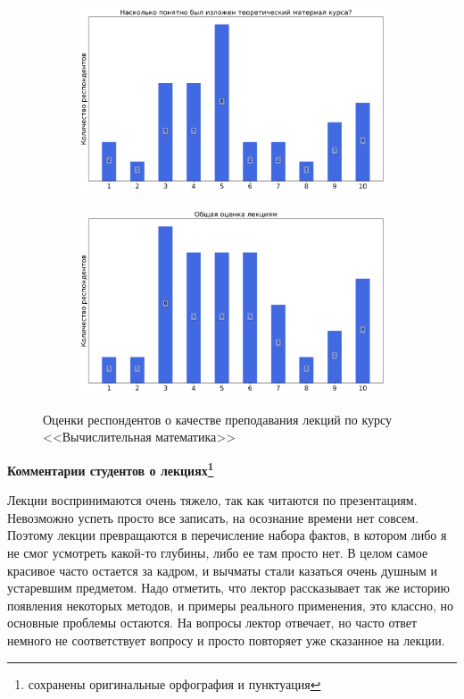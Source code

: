 \begin{figure}[H]
\begin{subfigure}[b]{0.45\textwidth}
			\end{subfigure}
			\begin{subfigure}[b]{0.45\textwidth}
				\centering
				\includegraphics[width=\textwidth]{images/3 course/Вычислительная математика/lecturer-marks-Петров И.Б.-2.png}
			\end{subfigure}	
			\begin{subfigure}[b]{0.45\textwidth}
				\centering
				\includegraphics[width=\textwidth]{images/3 course/Вычислительная математика/lecturer-marks-Петров И.Б.-3.png}
			\end{subfigure}
			\caption{Оценки респондентов о качестве преподавания лекций по курсу <<Вычислительная математика>>}
		\end{figure}

		\textbf{Комментарии студентов о лекциях\protect\footnote{сохранены оригинальные орфография и пунктуация}}
            \begin{commentbox} 
                Лекции  воспринимаются очень тяжело, так как читаются по презентациям. Невозможно успеть просто все записать, на осознание времени нет совсем. Поэтому лекции превращаются в перечисление набора фактов, в котором либо я не смог усмотреть какой-то глубины, либо ее там просто нет. В целом самое красивое часто остается за кадром, и вычматы стали казаться очень душным и устаревшим предметом. Надо отметить, что лектор рассказывает так же историю появления некоторых методов, и примеры реального применения, это классно, но основные проблемы остаются. На вопросы лектор отвечает, но часто ответ немного не соответствует вопросу и просто повторяет уже сказанное на лекции. 
            \end{commentbox} 
        
